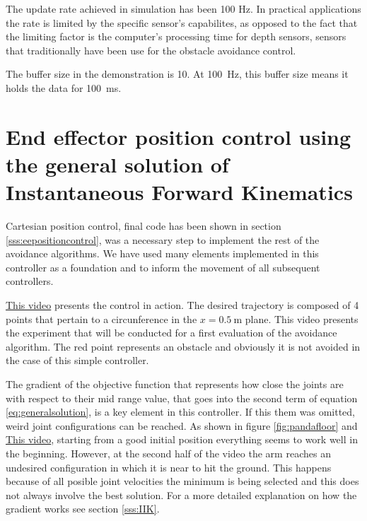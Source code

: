 The update rate achieved in simulation has been 100 Hz. In practical applications the rate is limited by the specific sensor's capabilites, as opposed to the fact that the limiting factor is the computer's processing time for depth sensors, sensors that traditionally have been use for the obstacle avoidance control.

The buffer size in the demonstration is 10. At \SI{100}{\hertz}, this buffer size means it holds the data for \SI{100}{\milli \second}.



\section{End effector position control using the general solution of Instantaneous Forward Kinematics}
\label{s:resultsposition}

Cartesian position control, final code has been shown in section \ref{sss:eepositioncontrol}, was a necessary step to implement the rest of the avoidance algorithms. We have used many elements implemented in this controller as a foundation and to inform the movement of all subsequent controllers.

\href{https://www.youtube.com/watch?v=o4eRN95Fb8s&list=PLnhdDYfKdsgimnQTQO-bmtKj-KRdbvGgS&index=3&t=0s}{This video} presents the control in action. The desired trajectory is composed of 4 points that pertain to a circunference in the $x = \SI{0.5}{\metre}$ plane. This video presents the experiment that will be conducted for a first evaluation of the avoidance algorithm. The red point represents an obstacle and obviously it is not avoided in the case of this simple controller.

The gradient of the objective function that represents how close the joints are with respect to their mid range value, that goes into the second term of equation \ref{eq:generalsolution}, is a key element in this controller. If this them was omitted, weird joint configurations can be reached. As shown in figure \ref{fig:pandafloor} and \href{https://www.youtube.com/watch?v=JcoRfB1JB88&list=PLnhdDYfKdsgimnQTQO-bmtKj-KRdbvGgS&index=4&t=0s}{This video}, starting from a good initial position everything seems to work well in the beginning. However, at the second half of the video the arm reaches an undesired configuration in which it is near to hit the ground. This happens because of all posible joint velocities the minimum is being selected and this does not always involve the best solution. For a more detailed explanation on how the gradient works see section \ref{sss:IIK}.

